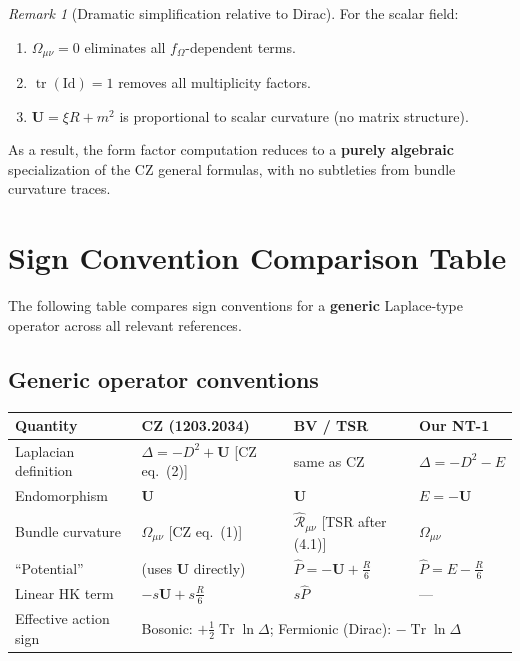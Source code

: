 \documentclass[12pt,a4paper]{article}
\theoremstyle{definition}
\theoremstyle{remark}
\newtheorem{remark}[proposition]{Remark}
\newcommand{\Tr}{\operatorname{Tr}}
\newcommand{\tr}{\operatorname{tr}}
\newcommand{\Id}{\mathrm{Id}}
\newcommand{\fromlit}[1]{\textcolor{blue!70!black}{\textsf{[#1]}}}
\begin{document}
\begin{remark}[Dramatic simplification relative to Dirac]
\label{rem:simplification}
For the scalar field:
\begin{enumerate}[nosep]
\item $\Omega_{\mu\nu} = 0$ eliminates all $f_\Omega$-dependent terms.
\item $\tr(\Id) = 1$ removes all multiplicity factors.
\item $\mathbf{U} = \xi R + m^2$ is proportional to scalar curvature
  (no matrix structure).
\end{enumerate}
As a result, the form factor computation reduces to a \textbf{purely
algebraic} specialization of the CZ general formulas, with no
subtleties from bundle curvature traces.
\end{remark}


\section{Sign Convention Comparison Table}
\label{sec:signs}

The following table compares sign conventions for a \textbf{generic}
Laplace-type operator across all relevant references.

\subsection{Generic operator conventions}

\begin{center}
\renewcommand{\arraystretch}{1.5}
\begin{tabular}{>{\raggedright}p{3cm} p{3cm} p{3cm} p{3cm}}
\toprule
\textbf{Quantity} &
\textbf{CZ (1203.2034)} &
\textbf{BV / TSR} &
\textbf{Our NT-1} \\
\midrule
Laplacian definition &
$\Delta = -D^2 + \mathbf{U}$ \fromlit{CZ eq.~(2)} &
same as CZ &
$\Delta = -D^2 - E$ \\
Endomorphism &
$\mathbf{U}$ &
$\mathbf{U}$ &
$E = -\mathbf{U}$ \\
Bundle curvature &
$\Omega_{\mu\nu}$ \fromlit{CZ eq.~(1)} &
$\hat{\mathcal{R}}_{\mu\nu}$ \fromlit{TSR after (4.1)} &
$\Omega_{\mu\nu}$ \\
``Potential'' &
(uses $\mathbf{U}$ directly) &
$\hat{P} = -\mathbf{U} + \frac{R}{6}$ &
$\hat{P} = E - \frac{R}{6}$ \\
Linear HK term &
$-s\mathbf{U} + s\frac{R}{6}$ &
$s\hat{P}$ &
--- \\
Effective action sign &
\multicolumn{3}{l}{Bosonic: $+\frac{1}{2}\Tr\ln\Delta$;\quad
  Fermionic (Dirac): $-\Tr\ln\Delta$} \\
\bottomrule
\end{tabular}
\end{center}
\end{document}
